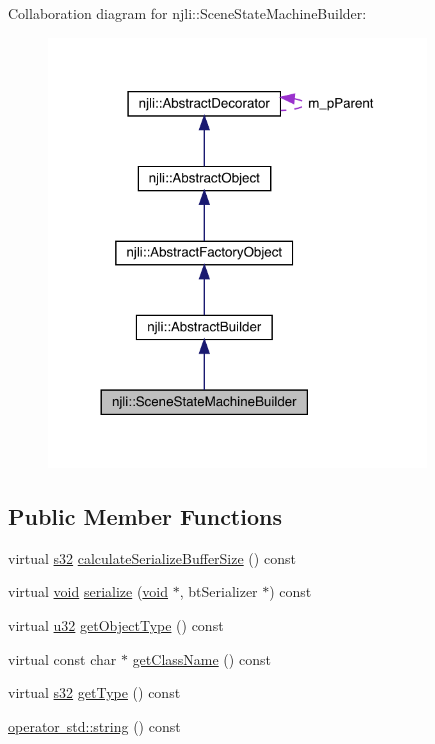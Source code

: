 Collaboration diagram for njli\+:\+:Scene\+State\+Machine\+Builder\+:\nopagebreak
\begin{figure}[H]
\begin{center}
\leavevmode
\includegraphics[width=284pt]{classnjli_1_1_scene_state_machine_builder__coll__graph}
\end{center}
\end{figure}
\subsection*{Public Member Functions}
\begin{DoxyCompactItemize}
\item 
virtual \mbox{\hyperlink{_util_8h_aa62c75d314a0d1f37f79c4b73b2292e2}{s32}} \mbox{\hyperlink{classnjli_1_1_scene_state_machine_builder_acd2f0c46e5235d4147cb649ec631ed3a}{calculate\+Serialize\+Buffer\+Size}} () const
\item 
virtual \mbox{\hyperlink{_thread_8h_af1e856da2e658414cb2456cb6f7ebc66}{void}} \mbox{\hyperlink{classnjli_1_1_scene_state_machine_builder_ad37279b99a3e8528b24eb24bffc0a940}{serialize}} (\mbox{\hyperlink{_thread_8h_af1e856da2e658414cb2456cb6f7ebc66}{void}} $\ast$, bt\+Serializer $\ast$) const
\item 
virtual \mbox{\hyperlink{_util_8h_a10e94b422ef0c20dcdec20d31a1f5049}{u32}} \mbox{\hyperlink{classnjli_1_1_scene_state_machine_builder_ae47cef2ded61a7fc61658ca3f9f92c50}{get\+Object\+Type}} () const
\item 
virtual const char $\ast$ \mbox{\hyperlink{classnjli_1_1_scene_state_machine_builder_aecc17e1921cac1cda12579de778d737a}{get\+Class\+Name}} () const
\item 
virtual \mbox{\hyperlink{_util_8h_aa62c75d314a0d1f37f79c4b73b2292e2}{s32}} \mbox{\hyperlink{classnjli_1_1_scene_state_machine_builder_ae3bc10469ad482428a105f933b25b506}{get\+Type}} () const
\item 
\mbox{\hyperlink{classnjli_1_1_scene_state_machine_builder_ad81f97274b9a9c03d0bdf33a9020bb14}{operator std\+::string}} () const
\end{DoxyCompactItemize}
